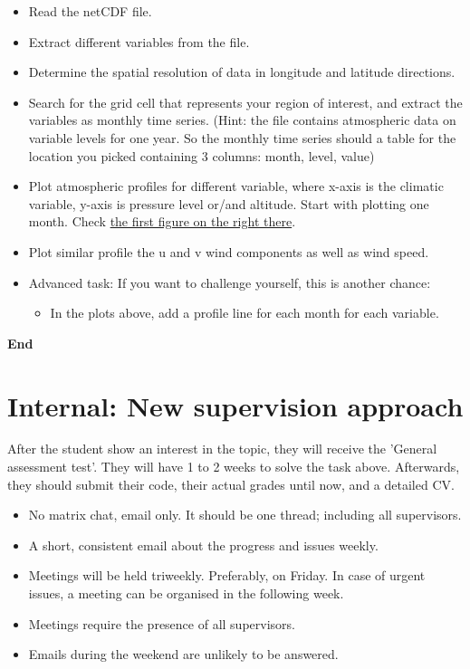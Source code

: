 \documentclass{article}
\begin{document}
\begin{itemize}
\item Read the netCDF file.
\item Extract different variables from the file. 
\item Determine the spatial resolution of data in longitude and latitude directions. 
\item Search for the grid cell that represents your region of interest, and extract the variables as monthly time series. 
    (Hint: the file contains atmospheric data on variable levels for one year. So the monthly time series should a table for the location you picked containing 3 columns: month, level, value)
\item Plot atmospheric profiles for different variable, where x-axis is the climatic variable, y-axis is pressure level or/and altitude. Start with plotting one month. Check \href{https://en.wikipedia.org/wiki/U.S._Standard_Atmosphere}{the first figure on the right there}. 
\item Plot similar profile the u and v wind components as well as wind speed. 
    
\item Advanced task: If you want to challenge yourself, this is  another chance: 
    \begin{itemize}
    \item In the plots above, add a profile line for each month for each variable. 
    \end{itemize}
\end{itemize}


\vspace{5mm}
\begin{center}
    \textbf{End}
\end{center}

\newpage
\section{Internal: New supervision approach}
After the student show an interest in the topic, they will receive the 'General assessment test'. They will have 1 to 2 weeks to solve the task above. Afterwards, they should submit their code, their actual grades until now, and a detailed CV. 

\begin{itemize}
\item No matrix chat, email only. It should be one thread; including all supervisors.  
\item A short, consistent email about the progress and issues weekly.
\item Meetings will be held triweekly. Preferably, on Friday. In case of urgent issues, a meeting can be organised in the following week.
\item Meetings require the presence of all supervisors. 
\item Emails during the weekend are unlikely to be answered.
\end{itemize}
\end{document}
